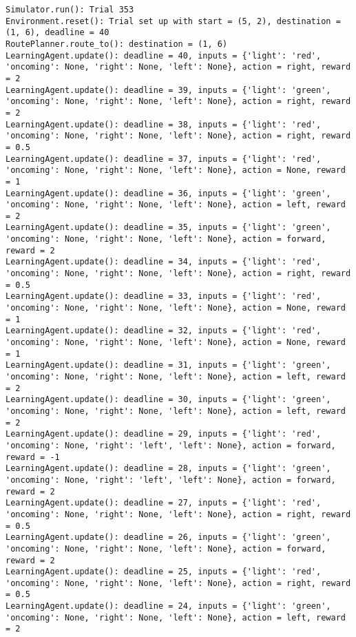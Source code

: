 \documentclass{article}
\begin{document}
\begin{verbatim}
Simulator.run(): Trial 353
Environment.reset(): Trial set up with start = (5, 2), destination = (1, 6), deadline = 40
RoutePlanner.route_to(): destination = (1, 6)
LearningAgent.update(): deadline = 40, inputs = {'light': 'red', 'oncoming': None, 'right': None, 'left': None}, action = right, reward = 2
LearningAgent.update(): deadline = 39, inputs = {'light': 'green', 'oncoming': None, 'right': None, 'left': None}, action = right, reward = 2
LearningAgent.update(): deadline = 38, inputs = {'light': 'red', 'oncoming': None, 'right': None, 'left': None}, action = right, reward = 0.5
LearningAgent.update(): deadline = 37, inputs = {'light': 'red', 'oncoming': None, 'right': None, 'left': None}, action = None, reward = 1
LearningAgent.update(): deadline = 36, inputs = {'light': 'green', 'oncoming': None, 'right': None, 'left': None}, action = left, reward = 2
LearningAgent.update(): deadline = 35, inputs = {'light': 'green', 'oncoming': None, 'right': None, 'left': None}, action = forward, reward = 2
LearningAgent.update(): deadline = 34, inputs = {'light': 'red', 'oncoming': None, 'right': None, 'left': None}, action = right, reward = 0.5
LearningAgent.update(): deadline = 33, inputs = {'light': 'red', 'oncoming': None, 'right': None, 'left': None}, action = None, reward = 1
LearningAgent.update(): deadline = 32, inputs = {'light': 'red', 'oncoming': None, 'right': None, 'left': None}, action = None, reward = 1
LearningAgent.update(): deadline = 31, inputs = {'light': 'green', 'oncoming': None, 'right': None, 'left': None}, action = left, reward = 2
LearningAgent.update(): deadline = 30, inputs = {'light': 'green', 'oncoming': None, 'right': None, 'left': None}, action = left, reward = 2
LearningAgent.update(): deadline = 29, inputs = {'light': 'red', 'oncoming': None, 'right': 'left', 'left': None}, action = forward, reward = -1
LearningAgent.update(): deadline = 28, inputs = {'light': 'green', 'oncoming': None, 'right': 'left', 'left': None}, action = forward, reward = 2
LearningAgent.update(): deadline = 27, inputs = {'light': 'red', 'oncoming': None, 'right': None, 'left': None}, action = right, reward = 0.5
LearningAgent.update(): deadline = 26, inputs = {'light': 'green', 'oncoming': None, 'right': None, 'left': None}, action = forward, reward = 2
LearningAgent.update(): deadline = 25, inputs = {'light': 'red', 'oncoming': None, 'right': None, 'left': None}, action = right, reward = 0.5
LearningAgent.update(): deadline = 24, inputs = {'light': 'green', 'oncoming': None, 'right': None, 'left': None}, action = left, reward = 2

\end{verbatim}
\end{document}
